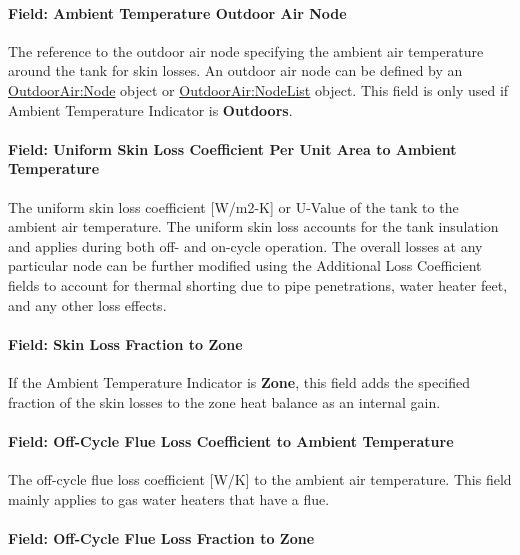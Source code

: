 \paragraph{Field: Ambient Temperature Outdoor Air Node}\label{field-ambient-temperature-outdoor-air-node}

The reference to the outdoor air node specifying the ambient air temperature around the tank for skin losses. An outdoor air node can be defined by an \hyperref[outdoorairnode]{OutdoorAir:Node} object or \hyperref[outdoorairnodelist]{OutdoorAir:NodeList} object. This field is only used if Ambient Temperature Indicator is \textbf{Outdoors}.

\paragraph{Field: Uniform Skin Loss Coefficient Per Unit Area to Ambient Temperature}\label{field-uniform-skin-loss-coefficient-per-unit-area-to-ambient-temperature-000}

The uniform skin loss coefficient {[}W/m2-K{]} or U-Value of the tank to the ambient air temperature. The uniform skin loss accounts for the tank insulation and applies during both off- and on-cycle operation. The overall losses at any particular node can be further modified using the Additional Loss Coefficient fields to account for thermal shorting due to pipe penetrations, water heater feet, and any other loss effects.

\paragraph{Field: Skin Loss Fraction to Zone}\label{field-skin-loss-fraction-to-zone}

If the Ambient Temperature Indicator is \textbf{Zone}, this field adds the specified fraction of the skin losses to the zone heat balance as an internal gain.

\paragraph{Field: Off-Cycle Flue Loss Coefficient to Ambient Temperature}\label{field-off-cycle-flue-loss-coefficient-to-ambient-temperature}

The off-cycle flue loss coefficient {[}W/K{]} to the ambient air temperature. This field mainly applies to gas water heaters that have a flue.

\paragraph{Field: Off-Cycle Flue Loss Fraction to Zone}\label{field-off-cycle-flue-loss-fraction-to-zone}

